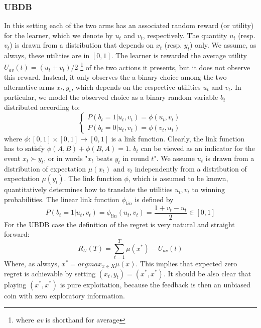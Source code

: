 \documentclass{llncs}
\begin{document}
	\subsubsection{UBDB}
		In this setting each of the two arms has an associated random reward (or utility) for the learner, which we denote by $u_t$ and $v_t$, respectively.
		The quantity $u_t$ (resp. $v_t$) is drawn from a distribution that depends on $x_t$ (resp. $y_t$) only.  
		We assume, as always, these utilities are in $[0, 1]$. 
		The learner is rewarded the average utility $ U_{av}(t) = (u_t + v_t)/2$ \footnote{ where \textit{av} is shorthand for average} of the two actions it presents, but it does not observe this reward. 
		Instead, it only observes the a binary choice among the two alternative arms $x_t, y_t$, which depends on the respective utilities $u_t$ and $v_t$. 
		In particular, we model the observed choice as a binary random variable $b_t$ distributed according to:
		\begin{equation}
		\begin{cases}
		P(b_t = 1|u_t, v_t) = \phi(u_t, v_t)
		\\
		P(b_t = 0|u_t, v_t) = \phi(v_t, u_t)
		\end{cases}
		\end{equation}			
	where $\phi:[0, 1] \times [0, 1] \rightarrow [0, 1]$ is a link function. 
	Clearly, the link function has to satisfy $\phi(A, B) + \phi(B, A) = 1$.
	$b_t$ can be viewed as an indicator for the event $x_t \succ y_t $, or in words "$x_t$ beats $y_t$ in round $t$".
	We assume $u_t$ is drawn from a distribution of expectation $\mu(x_t)$ and $v_t$ independently from a distribution of expectation $\mu(y_t)$.
	The link function $\phi$, which is assumed to be known, quantitatively determines how to translate the utilities $u_t, v_t$ to winning probabilities. 
	The linear link function $\phi_{lin}$ is defined by
	$$P(b_t = 1|u_t, v_t) = \phi_{lin}(u_t, v_t) = \frac{1+v_t-u_t}{2}\in [0,1]$$
	For the UBDB case the definition of the regret is very natural and straight forward:
	$$R_U(T) = \sum_{t=1}^T \mu(x^*)-U_{av}(t)$$ 
	Where, as always,  $x^* = argmax_{x \in X} \mu(x)$. 
	This implies that expected zero regret is achievable by setting $(x_t, y_t) = (x^*,x^*)$.
	It should be also clear that playing $(x^*,x^*)$ is pure exploitation, because the feedback is then an unbiased coin with zero exploratory information.
	
\end{document}
